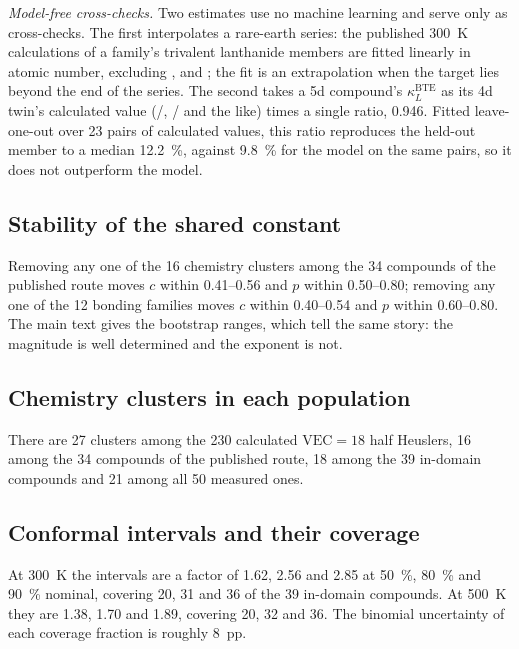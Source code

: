 \documentclass[preprint, 12pt]{elsarticle}
\begin{document}
\emph{Model-free cross-checks.} Two estimates use no machine learning and serve only as cross-checks.
The first interpolates a rare-earth series: the published \SI{300}{\kelvin} calculations of a
family's trivalent lanthanide members are fitted linearly in atomic number, excluding ,
 and ; the fit is an extrapolation when the target lies beyond the end of the series.
The second takes a 5d compound's $\kappa_L^{\mathrm{BTE}}$ as its 4d twin's calculated value
(/, / and the like) times a single ratio, \num{0.946}. Fitted
leave-one-out over \num{23} pairs of calculated values, this ratio reproduces the held-out member to a
median \SI{12.2}{\percent}, against \SI{9.8}{\percent} for the model on the same pairs, so it does not
outperform the model.

\subsection*{Stability of the shared constant}

Removing any one of the \num{16} chemistry clusters among the \num{34} compounds of the published
route moves $c$ within \numrange{0.41}{0.56} and $p$ within \numrange{0.50}{0.80}; removing any one
of the \num{12} bonding families moves $c$ within \numrange{0.40}{0.54} and $p$ within
\numrange{0.60}{0.80}. The main text gives the bootstrap ranges, which tell the same story: the
magnitude is well determined and the exponent is not.

\subsection*{Chemistry clusters in each population}

There are \num{27} clusters among the \num{230} calculated $\mathrm{VEC}=18$ half Heuslers,
\num{16} among the \num{34} compounds of the published route, \num{18} among the \num{39} in-domain
compounds and \num{21} among all \num{50} measured ones.

\subsection*{Conformal intervals and their coverage}

At \SI{300}{\kelvin} the intervals are a factor of \num{1.62}, \num{2.56} and \num{2.85} at
\SI{50}{\percent}, \SI{80}{\percent} and \SI{90}{\percent} nominal, covering \num{20}, \num{31} and
\num{36} of the \num{39} in-domain compounds. At \SI{500}{\kelvin} they are \num{1.38}, \num{1.70}
and \num{1.89}, covering \num{20}, \num{32} and \num{36}. The binomial uncertainty of each coverage
fraction is roughly \SI{8}{pp}.
\end{document}

